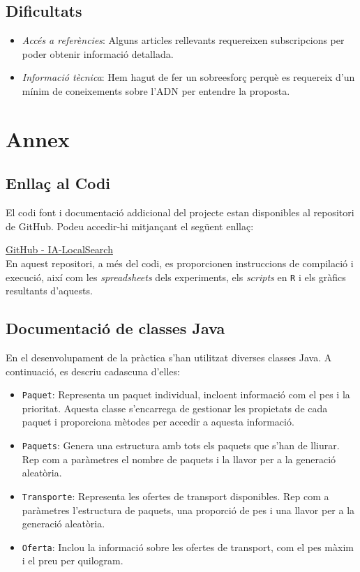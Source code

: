\documentclass[a4paper]{article}
\begin{document}
	
	\subsection{Dificultats}
	\begin{itemize}
		\item \emph{Accés a referències}: Alguns articles rellevants requereixen subscripcions per poder obtenir informació detallada.
		\item \emph{Informació tècnica}: Hem hagut de fer un sobreesforç perquè es requereix d'un mínim de coneixements sobre l'ADN per entendre la proposta.
	\end{itemize}
	
	\newpage
	\section{Annex}
	\label{sec:annex}
	
	\subsection*{Enllaç al Codi}
	
	El codi font i documentació addicional del projecte estan disponibles al repositori de GitHub. Podeu accedir-hi mitjançant el següent enllaç:
	
	\href{https://github.com/Willyllem88/IA-LocalSearch}{GitHub - IA-LocalSearch} \\
	
	En aquest repositori, a més del codi, es proporcionen instruccions de compilació i execució, així com les \textit{spreadsheets} dels experiments, els \textit{scripts} en \texttt{R} i els gràfics resultants d'aquests.

	\subsection*{Documentació de classes Java}
	
	En el desenvolupament de la pràctica s'han utilitzat diverses classes Java. A continuació, es descriu cadascuna d'elles:
	
	\begin{itemize}
		\item \texttt{Paquet}: Representa un paquet individual, incloent informació com el pes i la prioritat. Aquesta classe s'encarrega de gestionar les propietats de cada paquet i proporciona mètodes per accedir a aquesta informació.
		\item \texttt{Paquets}: Genera una estructura amb tots els paquets que s'han de lliurar. Rep com a paràmetres el nombre de paquets i la llavor per a la generació aleatòria.
		\item \texttt{Transporte}: Representa les ofertes de transport disponibles. Rep com a paràmetres l'estructura de paquets, una proporció de pes i una llavor per a la generació aleatòria.
		\item \texttt{Oferta}: Inclou la informació sobre les ofertes de transport, com el pes màxim i el preu per quilogram.
	\end{itemize}
	
\end{document}
